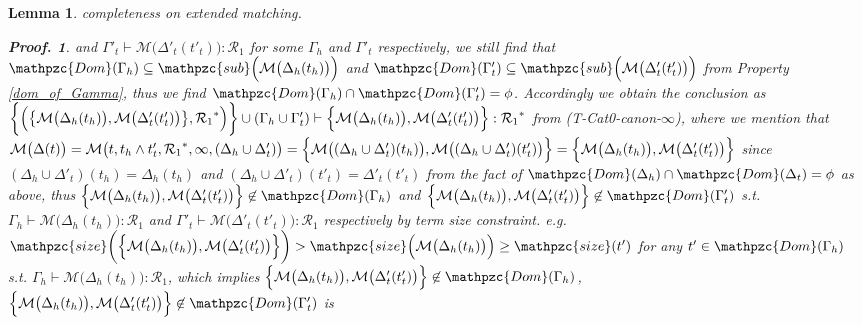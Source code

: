 \documentclass[12pt]{article}
\newtheorem{Lemma}{Lemma}[section]
\newtheorem{Proof}{Proof.}
\begin{document}
\begin{Lemma}{completeness on extended matching.}
\begin{Proof}
    and $\Gamma'_t \vdash \mathcal{M}\bigl(\Delta'_t(t'_t) \bigr) :
    \mathcal{R}_1$ for some $\Gamma_h$ and $\Gamma'_t$ respectively, we
    still find that
    $\mathpzc{Dom}(\Gamma_h) \subseteq \mathpzc{sub}\Bigl(\mathcal{M}\bigl(
    \Delta_h(t_h) \bigr) \Bigr)$ and
    $\mathpzc{Dom}(\Gamma'_t) \subseteq \mathpzc{sub}\Bigl(\mathcal{M}\bigl(
    \Delta'_t(t'_t) \bigr) \Bigr)$ from
    Property \ref{dom_of_Gamma}, thus we find
    $\mathpzc{Dom}(\Gamma_h) \cap \mathpzc{Dom}(\Gamma'_t) = \phi$.
    Accordingly we obtain the conclusion as
    $\biggl\{\Bigl(\bigl\{\mathcal{M}\bigl(\Delta_h(t_h) \bigr),
    \mathcal{M}\bigl(\Delta'_t(t'_t) \bigr) \bigr\}, {\mathcal{R}_1}^*
    \Bigr) \biggr\} \cup (\Gamma_h \cup \Gamma'_t) \vdash
    \Bigl\{\mathcal{M}\bigl(\Delta_h(t_h) \bigr), \mathcal{M}\bigl(
    \Delta'_t(t'_t) \bigr) \Bigr\} : {\mathcal{R}_1}^*$ from
    (T-Cat0-canon-$\infty$), where we mention that
    $\mathcal{M}\bigl(\Delta(t) \bigr) =
    \mathcal{M}\bigl(t, t_h \wedge t'_t, {\mathcal{R}_1}^*, \infty,
    (\Delta_h \cup \Delta'_t) \bigr) =
    \Bigl\{\mathcal{M}\bigl((\Delta_h \cup \Delta'_t)(t_h) \bigr),
    \mathcal{M}\bigl((\Delta_h \cup \Delta'_t)(t'_t) \bigr) \Bigr\} =
    \Bigl\{\mathcal{M}\bigl(\Delta_h(t_h) \bigr),
    \mathcal{M}\bigl(\Delta'_t(t'_t) \bigr) \Bigr\}$ since
    $(\Delta_h \cup \Delta'_t)(t_h) = \Delta_h(t_h)$ and
    $(\Delta_h \cup \Delta'_t)(t'_t) = \Delta'_t(t'_t)$ from the fact of
    $\mathpzc{Dom}(\Delta_h) \cap \mathpzc{Dom}(\Delta_t) = \phi$ as above,
    thus $\Bigl\{\mathcal{M}\bigl(\Delta_h(t_h) \bigr), \mathcal{M}\bigl(
    \Delta'_t(t'_t) \bigr) \Bigr\} \not\in \mathpzc{Dom}(\Gamma_h)$ and
    $\Bigl\{\mathcal{M}\bigl(\Delta_h(t_h) \bigr), \mathcal{M}\bigl(
    \Delta'_t(t'_t) \bigr) \Bigr\} \not\in \mathpzc{Dom}(\Gamma'_t)$ s.t.
    $\Gamma_h \vdash \mathcal{M}\bigl(\Delta_h(t_h) \bigr) : \mathcal{R}_1$
    and $\Gamma'_t \vdash \mathcal{M}\bigl(\Delta'_t(t'_t) \bigr) :
    \mathcal{R}_1$ respectively by term size constraint. e.g.
    $\mathpzc{size}\biggl(\Bigl\{\mathcal{M}\bigl(\Delta_h(t_h) \bigr),
    \mathcal{M}\bigl(\Delta'_t(t'_t) \bigr) \Bigr\} \biggr) >
    \mathpzc{size}\Bigl(\mathcal{M}\bigl(\Delta_h(t_h) \bigr) \Bigr) \ge
    \mathpzc{size}(t')$ for any $t' \in \mathpzc{Dom}(\Gamma_h)$ s.t.
    $\Gamma_h \vdash \mathcal{M}\bigl(\Delta_h(t_h) \bigr) : \mathcal{R}_1$, 
    which implies
    $\Bigl\{\mathcal{M}\bigl(\Delta_h(t_h) \bigr), \mathcal{M}\bigl(
    \Delta'_t(t'_t) \bigr) \Bigr\} \not\in \mathpzc{Dom}(\Gamma_h)$,
    $\Bigl\{\mathcal{M}\bigl(\Delta_h(t_h) \bigr), \mathcal{M}\bigl(
    \Delta'_t(t'_t) \bigr) \Bigr\} \not\in \mathpzc{Dom}(\Gamma'_t)$ is

\end{Proof}
\end{Lemma}
\end{document}
